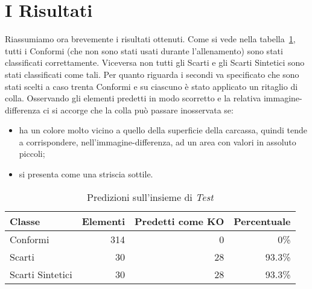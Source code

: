 \clearpage
\section{I Risultati}
Riassumiamo ora brevemente i risultati ottenuti.
Come si vede nella tabella~\ref{tab:test_predicions}, tutti i Conformi (che non sono stati usati durante l'allenamento) sono stati classificati correttamente.
Viceversa non tutti gli Scarti e gli Scarti Sintetici sono stati classificati come tali.
Per quanto riguarda i secondi va specificato che sono stati scelti a caso trenta Conformi e su ciascuno è stato applicato un ritaglio di colla.
Osservando gli elementi predetti in modo scorretto e la relativa immagine-differenza ci si accorge che la colla può passare inosservata se:
\begin{itemize}
  \item ha un colore molto vicino a quello della superficie della carcassa, quindi tende a corrispondere, nell'immagine-differenza, ad un area con valori in assoluto piccoli;
  \item si presenta come una striscia sottile.
\end{itemize}

\begin{table}[ht]
  \centering
  \begin{tabular}{||l r r r||}
    \hline
    Classe           & Elementi & Predetti come KO & Percentuale \\ \hline \hline
    Conformi         & 314      & 0                & 0\%         \\ \hline
    Scarti           & 30       & 28               & 93.3\%      \\ \hline
    Scarti Sintetici & 30       & 28               & 93.3\%      \\ \hline

  \end{tabular}
  \caption{Predizioni sull'insieme di \textit{Test}}
  \label{tab:test_predicions}
\end{table}

